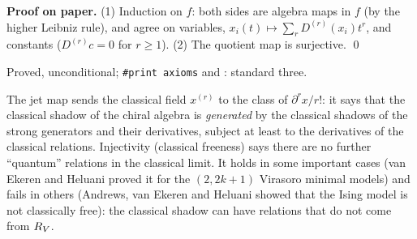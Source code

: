 \textbf{Proof on paper.} (1) Induction on $f$: both sides are algebra maps in $f$ (by the higher Leibniz rule), and
agree on variables, $x_i(t)\mapsto\sum_rD^{(r)}(x_i)t^r$, and constants ($D^{(r)}c = 0$ for $r\ge1$). (2) The
quotient map is surjective. \qed

\begin{status}
Proved, unconditional; \texttt{\#print axioms}  and
\allowbreak{}\allowbreak{}\allowbreak{}\allowbreak{}\allowbreak{}: standard three.
\end{status}

\begin{physics}
The jet map sends the classical field $x^{(r)}$ to the class of $\partial^rx/r!$: it says that the classical
shadow of the chiral algebra is \emph{generated} by the classical shadows of the strong generators and their
derivatives, subject at least to the derivatives of the classical relations. Injectivity (classical freeness) says
there are no further ``quantum'' relations in the classical limit. It holds in some important cases (van Ekeren and Heluani
proved it for the $(2,2k+1)$ Virasoro minimal models) and fails in others (Andrews, van Ekeren and Heluani showed that the Ising
model is not classically free): the classical shadow can have relations that do not come from $R_V$.
\end{physics}

